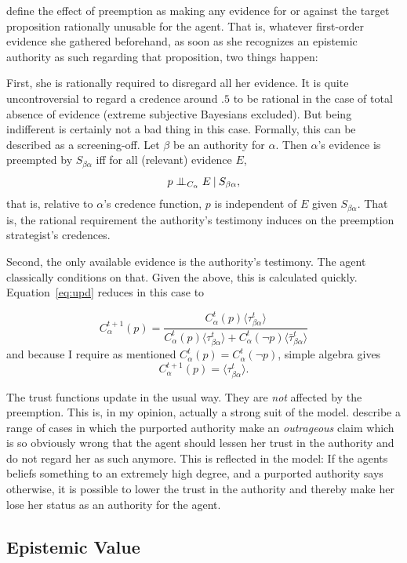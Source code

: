 \documentclass[11pt, a4paper]{scrartcl}
\newcommand{\given}[1][]{\:#1\vert\:}
\newcommand{\CI}{\mathrel{\perp\mspace{-10mu}\perp}}
\renewcommand{\i}[1]{\emph{#1}}
\renewcommand{\a}{\alpha}
\begin{document}
\textcite[p.12]{Constantin2017} define the effect of preemption as making any evidence for or against the target proposition rationally unusable for the agent. That is, whatever first-order evidence she gathered beforehand, as soon as she recognizes an epistemic authority as such regarding that proposition, two things happen: 

First, she is rationally required to disregard all her evidence. It is quite uncontroversial to regard a credence around $.5$ to be rational in the case of total absence of evidence (extreme subjective Bayesians excluded). But being indifferent is certainly not a bad thing in this case. Formally, this can be described as a screening-off. Let $\beta$ be an authority for $\alpha$. Then $\a$'s evidence is preempted by $S_{\beta\a}$ iff for all (relevant) evidence $E$, 
\[ 
    p \CI_{C_\a} E \given S_{\beta\a}, 
\]
that is, relative to $\a$'s credence function, $p$ is independent of $E$ given $S_{\beta\a}$. That is, the rational requirement the authority's testimony induces on the preemption strategist's credences.

Second, the only available evidence is the authority's testimony. The agent classically conditions on that. Given the above, this is calculated quickly. Equation~\ref{eq:upd} reduces in this case to 

\[
    C^{t+1}_\a (p) = \frac{C^t_\a(p) \langle \tau^t_{\beta\a} \rangle}
    {C^t_\a(p) \langle \tau^t_{\beta\a} \rangle + C^t_\a(\neg p) \langle \bar{\tau}^t_{\beta\a} \rangle}
\]
and because I require as mentioned $C^t_\a(p) = C^t_\a( \neg p)$, simple algebra gives 
\[
    C^{t+1}_\a (p) = \langle \tau^t_{\beta\a} \rangle.
\]

The trust functions update in the usual way. They are \i{not} affected by the preemption. This is, in my opinion, actually a strong suit of the model. \textcite[p. XX]{Constantin2017} describe a range of cases in which the purported authority make an  \i{outrageous} claim which is so obviously wrong that the agent should lessen her trust in the authority and do not regard her as such anymore. This is reflected in the model: If the agents beliefs something to an extremely high degree, and a purported authority says otherwise, it is possible to lower the trust in the authority and thereby make her lose her status as an authority for the agent. 

\subsection{Epistemic Value}
\end{document}
